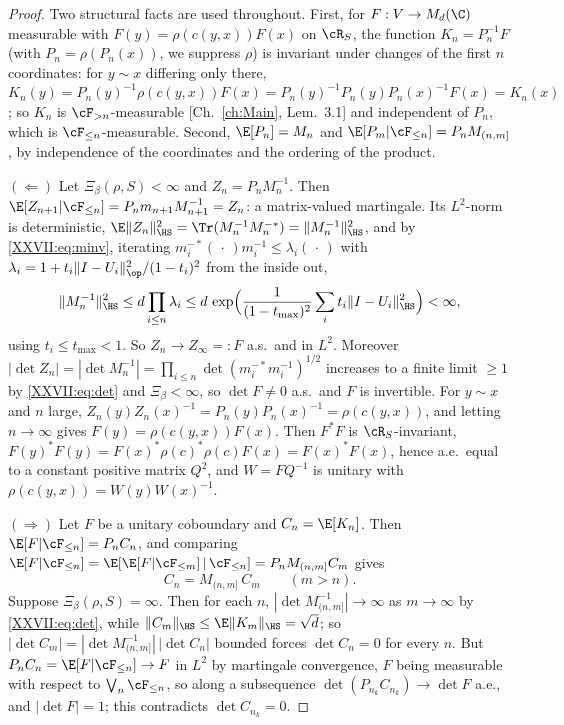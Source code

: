 \begin{proof}
Two structural facts are used throughout. First, for $F:V\to M_d(\C)$ measurable with
$F(y)=\rho(c(y,x))F(x)$ on $\cR_S$, the function $K_n=P_n^{-1}F$ (with $P_n=\rho(P_n(x))$, we
suppress $\rho$) is invariant under changes of the first $n$ coordinates: for $y\sim x$
differing only there, $K_n(y)=P_n(y)^{-1}\rho(c(y,x))F(x)=P_n(y)^{-1}P_n(y)P_n(x)^{-1}F(x)=K_n(x)$;
so $K_n$ is $\cF_{>n}$-measurable [Ch.~\ref{ch:Main}, Lem.~3.1] and independent of $P_n$, which is
$\cF_{\le n}$-measurable. Second, $\E[P_n]=M_n$ and $\E[P_m|\cF_{\le n}]=P_nM_{(n,m]}$, by
independence of the coordinates and the ordering of the product.

$(\Leftarrow)$ Let $\Xi_\beta(\rho,S)<\infty$ and $Z_n=P_nM_n^{-1}$. Then
$\E[Z_{n+1}|\cF_{\le n}]=P_nm_{n+1}M_{n+1}^{-1}=Z_n$: a matrix-valued martingale. Its
$L^2$-norm is deterministic, $\E\|Z_n\|_{\HS}^2=\Tr(M_n^{-1}M_n^{-*})=\|M_n^{-1}\|_{\HS}^2$,
and by \eqref{XXVII:eq:minv}, iterating $m_{i}^{-*}(\,\cdot\,)m_i^{-1}\le\lambda_i(\,\cdot\,)$ with
$\lambda_i=1+t_i\|I-U_i\|_{\op}^2/(1-t_i)^2$ from the inside out,
\[
\|M_n^{-1}\|_{\HS}^2\le d\prod_{i\le n}\lambda_i\le d\,\exp\Bigl(\frac{1}{(1-t_{\max})^2}\sum_it_i\|I-U_i\|_{\HS}^2\Bigr)<\infty ,
\]
using $t_i\le t_{\max}<1$. So $Z_n\to Z_\infty=:F$ a.s.\ and in $L^2$. Moreover
$|\det Z_n|=|\det M_n^{-1}|=\prod_{i\le n}\det(m_i^{-*}m_i^{-1})^{1/2}$ increases to a finite
limit $\ge1$ by \eqref{XXVII:eq:det} and $\Xi_\beta<\infty$, so $\det F\ne0$ a.s.\ and $F$ is
invertible. For $y\sim x$ and $n$ large, $Z_n(y)Z_n(x)^{-1}=P_n(y)P_n(x)^{-1}=\rho(c(y,x))$, and
letting $n\to\infty$ gives $F(y)=\rho(c(y,x))F(x)$. Then $F^*F$ is $\cR_S$-invariant,
$F(y)^*F(y)=F(x)^*\rho(c)^*\rho(c)F(x)=F(x)^*F(x)$, hence a.e.\ equal to a constant positive
matrix $Q^2$, and $W=FQ^{-1}$ is unitary with $\rho(c(y,x))=W(y)W(x)^{-1}$.

$(\Rightarrow)$ Let $F$ be a unitary coboundary and $C_n=\E[K_n]$. Then
$\E[F|\cF_{\le n}]=P_nC_n$, and comparing $\E[F|\cF_{\le n}]=\E[\E[F|\cF_{\le m}]\,|\,\cF_{\le n}]=P_nM_{(n,m]}C_m$
gives
\begin{equation}\label{XXVII:eq:consist}
C_n=M_{(n,m]}\,C_m\qquad(m>n).
\end{equation}
Suppose $\Xi_\beta(\rho,S)=\infty$. Then for each $n$, $|\det M_{(n,m]}^{-1}|\to\infty$ as
$m\to\infty$ by \eqref{XXVII:eq:det}, while $\|C_m\|_{\HS}\le\E\|K_m\|_{\HS}=\sqrt d$; so
$|\det C_m|=|\det M_{(n,m]}^{-1}|\,|\det C_n|$ bounded forces $\det C_n=0$ for every $n$. But
$P_nC_n=\E[F|\cF_{\le n}]\to F$ in $L^2$ by martingale convergence, $F$ being measurable with
respect to $\bigvee_n\cF_{\le n}$, so along a subsequence $\det(P_{n_k}C_{n_k})\to\det F$
a.e., and $|\det F|=1$; this contradicts $\det C_{n_k}=0$.
\end{proof}

